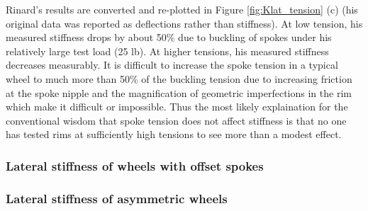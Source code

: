 \documentclass[\rootdir/thesis.tex]{subfiles}
\begin{document}
Rinard's results are converted and re-plotted in Figure \ref{fig:Klat_tension} (c) (his original data was reported as deflections rather than stiffness). At low tension, his measured stiffness drops by about 50\% due to buckling of spokes under his relatively large test load (25 lb). At higher tensions, his measured stiffness decreases measurably. It is difficult to increase the spoke tension in a typical wheel to much more than 50\% of the buckling tension due to increasing friction at the spoke nipple and the magnification of geometric imperfections in the rim which make it difficult or impossible. Thus the most likely explaination for the conventional wisdom that spoke tension does not affect stiffness is that no one has tested rims at sufficiently high tensions to see more than a modest effect.


\subsubsection{Lateral stiffness of wheels with offset spokes}
\inprogress

\subsubsection{Lateral stiffness of asymmetric wheels}
\inprogress


\end{document}
